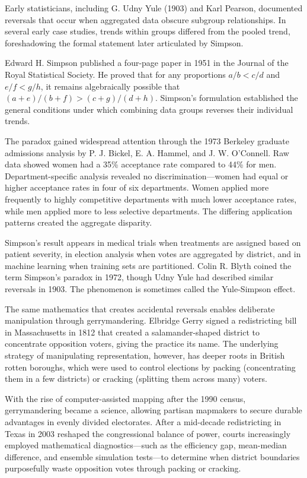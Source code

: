 \begin{historical}
Early statisticians, including G. Udny Yule (1903) and Karl Pearson, documented reversals that occur when aggregated data obscure subgroup relationships. In several early case studies, trends within groups differed from the pooled trend, foreshadowing the formal statement later articulated by Simpson.

Edward H. Simpson published a four-page paper in 1951 in the Journal of the Royal Statistical Society. He proved that for any proportions $a/b < c/d$ and $e/f < g/h$, it remains algebraically possible that $(a+e)/(b+f) > (c+g)/(d+h)$. Simpson's formulation established the general conditions under which combining data groups reverses their individual trends.

The paradox gained widespread attention through the 1973 Berkeley graduate admissions analysis by P. J. Bickel, E. A. Hammel, and J. W. O'Connell. Raw data showed women had a 35\% acceptance rate compared to 44\% for men. Department-specific analysis revealed no discrimination—women had equal or higher acceptance rates in four of six departments. Women applied more frequently to highly competitive departments with much lower acceptance rates, while men applied more to less selective departments. The differing application patterns created the aggregate disparity.

Simpson's result appears in medical trials when treatments are assigned based on patient severity, in election analysis when votes are aggregated by district, and in machine learning when training sets are partitioned. Colin R. Blyth coined the term \QSOpen{}Simpson's paradox\QSClose{} in 1972, though Udny Yule had described similar reversals in 1903. The phenomenon is sometimes called the Yule-Simpson effect.

The same mathematics that creates accidental reversals enables deliberate manipulation through gerrymandering. Elbridge Gerry signed a redistricting bill in Massachusetts in 1812 that created a salamander-shaped district to concentrate opposition voters, giving the practice its name. The underlying strategy of manipulating representation, however, has deeper roots in British \QSOpen{}rotten boroughs\QSClose{}, which were used to control elections by packing (concentrating them in a few districts) or cracking (splitting them across many) voters.

With the rise of computer-assisted mapping after the 1990 census, gerrymandering became a science, allowing partisan mapmakers to secure durable advantages in evenly divided electorates. After a mid-decade redistricting in Texas in 2003 reshaped the congressional balance of power, courts increasingly employed mathematical diagnostics—such as the efficiency gap, mean-median difference, and ensemble simulation tests—to determine when district boundaries purposefully waste opposition votes through packing or cracking. 
\end{historical}
